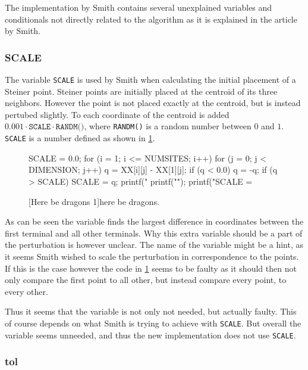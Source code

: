 The implementation by Smith contains several unexplained variables and conditionals not
directly related to the algorithm as it is explained in the article by Smith.

\subsubsection{SCALE}
\label{sec:scale}

The variable \texttt{SCALE} is used by Smith when calculating the initial
placement of a Steiner point.  Steiner points are initially placed at the
centroid of its three neighbors.  However the point is not placed exactly at the
centroid, but is instead pertubed slightly.  To each coordinate of the centroid
is added $0.001 \cdot \texttt{SCALE} \cdot \texttt{RANDM()}$, where \texttt{RANDM()} is a
random number between $0$ and $1$.  \texttt{SCALE} is a number defined as shown
in \cref{fig:randm}.

\begin{figure}[htbp]
\begin{c-code}
SCALE = 0.0;
for (i = 1; i <= NUMSITES; i++) {
  for (j = 0; j < DIMENSION; j++) {
    q = XX[i][j] - XX[1][j];
    if (q < 0.0) q = -q;
    if (q > SCALE) SCALE = q;
    printf(" %
  }
  printf("\n");
}
printf("SCALE = %
\end{c-code}
  [Here be dragons 1]{here be dragons.\label{fig:randm}}
\end{figure}

As can be seen the variable finds the largest difference in coordinates between the first
terminal and all other terminals.  Why this extra variable should be a part of
the perturbation is however unclear.  The name of the variable might be a hint,
as it seems Smith wished to scale the perturbation in correspondence to the
points.  If this is the case however the code in \cref{fig:randm} seems to be
faulty as it should then not only compare the first point to all other, but
instead compare every point, to every other.

Thus it seems that the variable is not only not needed, but actually faulty.
This of course depends on what Smith is trying to achieve with \texttt{SCALE}.
But overall the variable seems unneeded, and thus the new implementation does
not use \texttt{SCALE}.

\subsubsection{tol}
\label{sec:tol}

